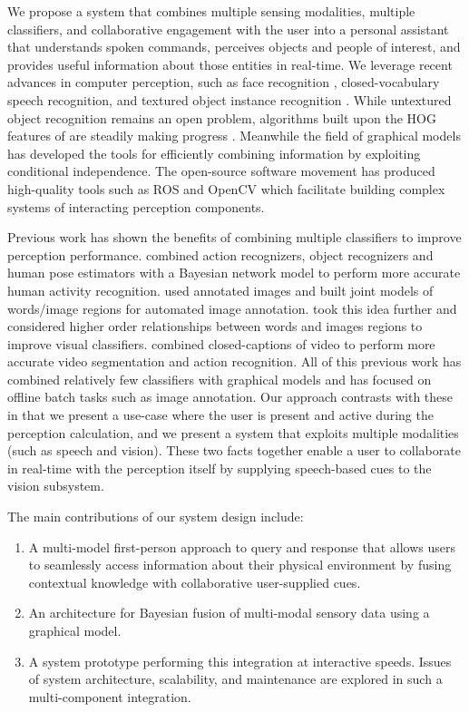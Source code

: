 \documentclass{llncs}
\begin{document}
We propose a system that combines multiple sensing modalities,
multiple classifiers, and collaborative engagement with the user into
a personal assistant that understands spoken commands, perceives
objects and people of interest, and provides useful information about
those entities in real-time. We leverage recent advances in computer
perception, such as face recognition \citep{lbph,fisherfaces},
closed-vocabulary speech recognition, and textured object instance
recognition \citep{moped}. While untextured object recognition remains
an open problem, algorithms built upon the HOG features of
\citet{DT05} are steadily making progress \citep[e.g.,
][]{lsvm-pami,exemplarsvm}. Meanwhile the field of graphical models
has developed the tools for efficiently combining information by
exploiting conditional independence. The open-source software movement
has produced high-quality tools such as ROS \citep{ros} and OpenCV
\citep{opencv} which facilitate building complex systems of
interacting perception components.

Previous work has shown the benefits of combining multiple classifiers
to improve perception performance. \citet{Gupta2007} combined action
recognizers, object recognizers and human pose estimators with a
Bayesian network model to perform more accurate human activity
recognition. \citet{Barnard2003} used annotated images and built joint
models of words/image regions for automated image
annotation. \citet{Gupta2008} took this idea further and considered
higher order relationships between words and images regions to improve
visual classifiers. \citet{Cour2008} combined closed-captions of video
to perform more accurate video segmentation and action
recognition. All of this previous work has combined relatively few
classifiers with graphical models and has focused on offline batch
tasks such as image annotation. Our approach contrasts with these in
that we present a use-case where the user is present and active during
the perception calculation, and we present a system that exploits
multiple modalities (such as speech and vision). These two facts
together enable a user to collaborate in real-time with the perception
itself by supplying speech-based cues to the vision subsystem.

The main contributions of our system design include:\vspace{-0.04in}
\begin{enumerate}
\item A multi-model first-person approach to query and response that
  allows users to seamlessly access information about their physical
  environment by fusing contextual knowledge with collaborative
  user-supplied cues.
\item An architecture for Bayesian fusion of multi-modal sensory data using a graphical model.
\item A system prototype performing this integration at interactive
  speeds. Issues of system architecture, scalability, and maintenance
  are explored in such a multi-component integration.
\end{enumerate}
\end{document}
